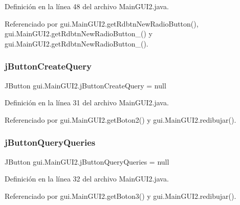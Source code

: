 Definición en la línea 48 del archivo Main\+G\+U\+I2.\+java.



Referenciado por gui.\+Main\+G\+U\+I2.\+get\+Rdbtn\+New\+Radio\+Button(), gui.\+Main\+G\+U\+I2.\+get\+Rdbtn\+New\+Radio\+Button\+\_() y gui.\+Main\+G\+U\+I2.\+get\+Rdbtn\+New\+Radio\+Button\+\_().

\mbox{\label{classgui_1_1MainGUI2_a823df1e5df1fa562352500c85738ad5a}} 
\subsubsection{\texorpdfstring{jButtonCreateQuery}{jButtonCreateQuery}}
{\footnotesize\ttfamily J\+Button gui.\+Main\+G\+U\+I2.\+j\+Button\+Create\+Query = null\hspace{0.3cm}{\ttfamily [private]}}



Definición en la línea 31 del archivo Main\+G\+U\+I2.\+java.



Referenciado por gui.\+Main\+G\+U\+I2.\+get\+Boton2() y gui.\+Main\+G\+U\+I2.\+redibujar().

\mbox{\label{classgui_1_1MainGUI2_a9a622ef3a316e94fc301b0df09804880}} 
\subsubsection{\texorpdfstring{jButtonQueryQueries}{jButtonQueryQueries}}
{\footnotesize\ttfamily J\+Button gui.\+Main\+G\+U\+I2.\+j\+Button\+Query\+Queries = null\hspace{0.3cm}{\ttfamily [private]}}



Definición en la línea 32 del archivo Main\+G\+U\+I2.\+java.



Referenciado por gui.\+Main\+G\+U\+I2.\+get\+Boton3() y gui.\+Main\+G\+U\+I2.\+redibujar().

\mbox{\label{classgui_1_1MainGUI2_a814dd148cfa183baefc197af2e743465}} 
